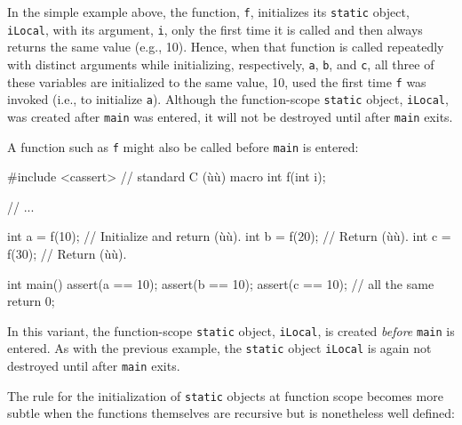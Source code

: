 \noindent In the simple example above, the function, \lstinline!f!, initializes its
\lstinline!static! object, \lstinline!iLocal!, with its argument, \lstinline!i!, only
the first time it is called and then always returns the same value
(e.g., 10). Hence, when that function is called repeatedly with distinct
arguments while initializing, respectively, \lstinline!a!, \lstinline!b!, and
\lstinline!c!, all three of these variables are initialized to the same
value, 10, used the first time \lstinline!f! was invoked (i.e., to
initialize \lstinline!a!). Although the function-scope \lstinline!static!
object, \lstinline!iLocal!, was created after \lstinline!main! was entered, it
will not be destroyed until after \lstinline!main! exits.

A function such as \lstinline!f! might also be called before \lstinline!main!
is entered:

\begin{emcppshiddenlisting}[emcppsbatch=e1]
#include <cassert>  // standard C (ù{}ù) macro
int f(int i);
\end{emcppshiddenlisting}
\begin{emcppslisting}[emcppsbatch=e1]
// ...

int a = f(10);  // Initialize and return (ù{}ù).
int b = f(20);  // Return (ù{}ù).
int c = f(30);  // Return (ù{}ù).

int main()
{
    assert(a == 10);  assert(b == 10);  assert(c == 10);  // all the same
    return 0;
}
\end{emcppslisting}

\noindent In this variant, the function-scope \lstinline!static! object,
\lstinline!iLocal!, is created \emph{before} \lstinline!main! is entered. As
with the previous example, the \lstinline!static! object
\lstinline!iLocal! is again not destroyed until after \lstinline!main! exits.

The rule for the initialization of \lstinline!static! objects at function
scope becomes more subtle when the functions themselves are recursive
but is nonetheless well defined:

